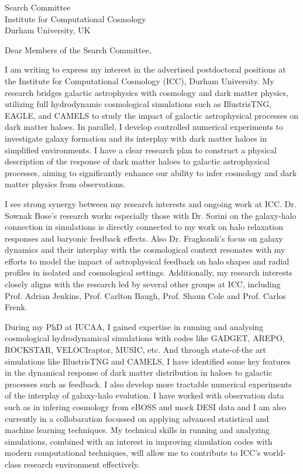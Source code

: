 \documentclass[10pt]{letter}
\date{December 16, 2024}
\begin{document}
\begin{letter}{Search Committee \\ Institute for Computational Cosmology \\ Durham University, UK}

\opening{Dear Members of the Search Committee,}

I am writing to express my interest in the advertised postdoctoral positions at the Institute for Computational Cosmology (ICC), Durham University. My research bridges galactic astrophysics with cosmology and dark matter physics, utilizing full hydrodynamic cosmological simulations such as IllustrisTNG, EAGLE, and CAMELS to study the impact of galactic astrophysical processes on dark matter haloes. In parallel, I develop controlled numerical experiments to investigate galaxy formation and its interplay with dark matter haloes in simplified environments. I have a clear research plan to construct a physical description of the response of dark matter haloes to galactic astrophysical processes, aiming to significantly enhance our ability to infer cosmology and dark matter physics from observations.

I see strong synergy between my research interests and ongoing work at ICC. Dr. Sownak Bose’s research works especially those with Dr. Sorini on the galaxy-halo connection in simulations is directly connected to my work on halo relaxation responses and baryonic feedback effects. Also Dr. Fragkoudi’s focus on galaxy dynamics and their interplay with the cosmological context resonates with my efforts to model the impact of astrophysical feedback on halo shapes and radial profiles in isolated and cosmological settings. Additionally, my research interests closely aligns with the research led by several other groups at ICC, including Prof. Adrian Jenkins, Prof. Carlton Baugh, Prof. Shaun Cole and Prof. Carlos Frenk.

During my PhD at IUCAA, I gained expertise in running and analysing cosmological hydrodynamical simulations with codes like GADGET, AREPO, ROCKSTAR, VELOCIraptor, MUSIC, etc. And through state-of-the art simulations like IllustrisTNG and CAMELS, I have identified some key features in the dynamical response of dark matter distribution in haloes to galactic processes such as feedback. I also develop more tractable numerical experiments of the interplay of galaxy-halo evolution. I have worked with observation data such as in infering cosmology from eBOSS and mock DESI data and I am also currently in a collobaration focussed on applying advanced statistical and machine learning techniques. My technical skills in running and analyzing simulations, combined with an interest in improving simulation codes with modern computational techniques, will allow me to contribute to ICC’s world-class research environment effectively.


\end{letter}
\end{document}
